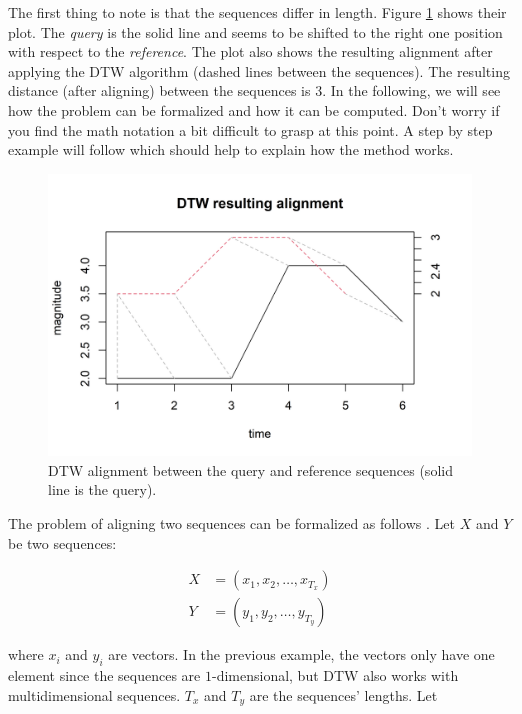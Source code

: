 \documentclass[
  11pt,
]{krantz}
\begin{document}
The first thing to note is that the sequences differ in length. Figure \ref{fig:queryref} shows their plot. The \emph{query} is the solid line and seems to be shifted to the right one position with respect to the \emph{reference}. The plot also shows the resulting alignment after applying the DTW algorithm (dashed lines between the sequences). The resulting distance (after aligning) between the sequences is \(3\). In the following, we will see how the problem can be formalized and how it can be computed. Don't worry if you find the math notation a bit difficult to grasp at this point. A step by step example will follow which should help to explain how the method works.

\begin{figure}

{\centering \includegraphics[width=1\linewidth]{images/query_ref} 

}

\caption{DTW alignment between the query and reference sequences (solid line is the query).}\label{fig:queryref}
\end{figure}

The problem of aligning two sequences can be formalized as follows \citep{Rabiner1993}. Let \(X\) and \(Y\) be two sequences:

\begin{align*}
X&=(x_1,x_2,\dots,x_{T_x}) \\
Y&=(y_1,y_2,\dots,y_{T_y})
\end{align*}

where \(x_i\) and \(y_i\) are vectors. In the previous example, the vectors only have one element since the sequences are \(1\)-dimensional, but DTW also works with multidimensional sequences. \(T_x\) and \(T_y\) are the sequences' lengths. Let
\end{document}
